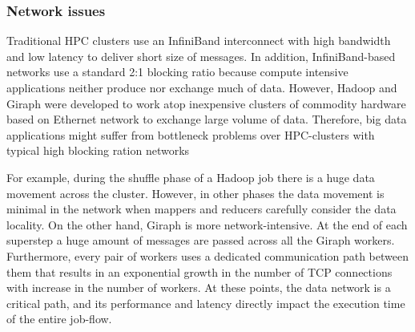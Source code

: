 \documentclass[conference]{IEEEtran}
\begin{document}
\subsubsection {Network issues}
Traditional HPC clusters use an InfiniBand interconnect with high bandwidth and low latency to deliver short size of messages. In addition, InfiniBand-based networks use a standard 2:1 blocking ratio because compute intensive applications neither produce nor exchange much of data.
However, Hadoop and Giraph were developed to work atop inexpensive clusters of commodity hardware based on Ethernet network to exchange large volume of data.
Therefore, big data applications might suffer from bottleneck problems over HPC-clusters with typical high blocking ration networks

For example, during the shuffle phase of a Hadoop job there is a huge data movement across the cluster. However, in other phases the data movement is minimal in the network when mappers and reducers carefully consider the data locality. 
On the other hand, Giraph is more network-intensive. 
At the end of each superstep a huge amount of messages are passed across all the Giraph workers. 
Furthermore, every pair of workers uses a dedicated communication path between them that results in an exponential growth in the number of TCP connections with increase in the number of workers. 
At these points, the data network is a critical path, and its performance and latency directly impact the execution time of the entire job-flow.
\end{document}
